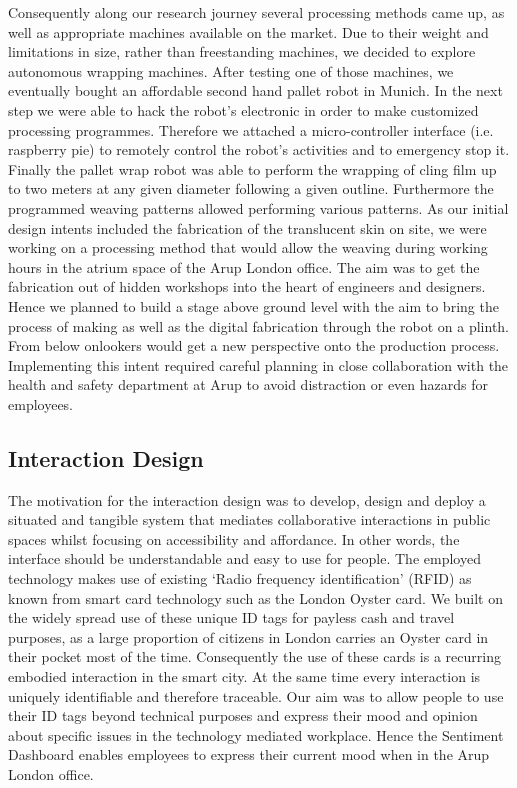 Consequently along our research journey several processing methods came up, as well as appropriate machines available on the market. Due to their weight and limitations in size, rather than freestanding machines, we decided to explore autonomous wrapping machines. After testing one of those machines, we eventually bought an affordable second hand pallet robot in Munich. In the next step we were able to hack the robot’s electronic in order to make customized processing programmes. Therefore we attached a micro-controller interface (i.e. raspberry pie) to remotely control the robot’s activities and to emergency stop it. Finally the pallet wrap robot was able to perform the wrapping of cling film up to two meters at any given diameter following a given outline. Furthermore the programmed weaving patterns allowed performing various patterns. 
As our initial design intents included the fabrication of the translucent skin on site, we were working on a processing method that would allow the weaving during working hours in the atrium space of the Arup London office. The aim was to get the fabrication out of hidden workshops into the heart of engineers and designers. Hence we planned to build a stage above ground level with the aim to bring the process of making as well as the digital fabrication through the robot on a plinth. From below onlookers would get a new perspective onto the production process. Implementing this intent required careful planning in close collaboration with the health and safety department at Arup to avoid distraction or even hazards for employees.

\subsection{Interaction Design}

The motivation for the interaction design was to develop, design and deploy a situated and tangible system that mediates collaborative interactions in public spaces whilst focusing on accessibility and affordance. In other words, the interface should be understandable and easy to use for people. The employed technology makes use of existing ‘Radio frequency identification’ (RFID) as known from smart card technology such as the London Oyster card. We built on the widely spread use of these unique ID tags for payless cash and travel purposes, as a large proportion of citizens in London carries an Oyster card in their pocket most of the time. Consequently the use of these cards is a recurring embodied interaction in the smart city. At the same time every interaction is uniquely identifiable and therefore traceable. Our aim was to allow people to use their ID tags beyond technical purposes and express their mood and opinion about specific issues in the technology mediated workplace. Hence the Sentiment Dashboard enables employees to express their current mood when in the Arup London office. 

